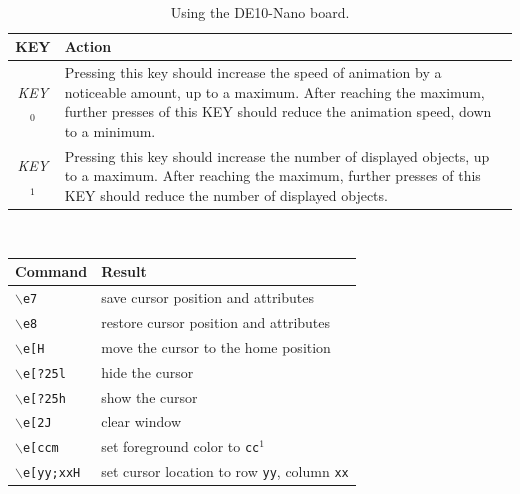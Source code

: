 \documentclass[epsfig,10pt,fullpage]{article}
\newcommand{\CommonDocsPath}{../../common/docs}
\begin{document}
\begin{table}[h]
\caption{Using the DE10-Nano board.}
~\\
\centering
\label{tab:action2}
\begin{tabular}{c|p{13cm}}
{\bf KEY} & {\bf Action} \\ \hline
\rule{0cm}{12pt}{\it KEY}$_0$ & Pressing this key should increase the speed of animation by a noticeable amount, up to a maximum. After reaching the maximum, further presses of this KEY should reduce the animation speed, down to a minimum.\\
{\it KEY}$_1$ & Pressing this key should increase the number of displayed objects, up to a maximum. After reaching the maximum, further presses of this KEY should reduce the number of displayed objects.\\
\end{tabular}
\end{table}

{}
\begin{table}[H]
~\\
\centering
\label{tab:vt100}
\begin{tabular}{l|l}
		  {\bf Command} & {\bf Result} \\ \hline
		  \rule{0cm}{12pt}\texttt{$\backslash$e7} & save cursor position and attributes\\
		  \texttt{$\backslash$e8} & restore cursor position and attributes\\
		  \texttt{$\backslash$e[H} & move the cursor to the home position\\
		  \texttt{$\backslash$e[?25l} & hide the cursor \\
		  \texttt{$\backslash$e[?25h} & show the cursor \\
		  \texttt{$\backslash$e[2J} & clear window \\
		  \texttt{$\backslash$e[ccm} & set foreground color to \texttt{cc}$^1$ \\
		  \texttt{$\backslash$e[yy;xxH} & set cursor location to row \texttt{yy}, column \texttt{xx}
		  
\end{tabular}
\end{table}
~\\
~\\
\noindent
\newpage

\clearpage
\end{document}
